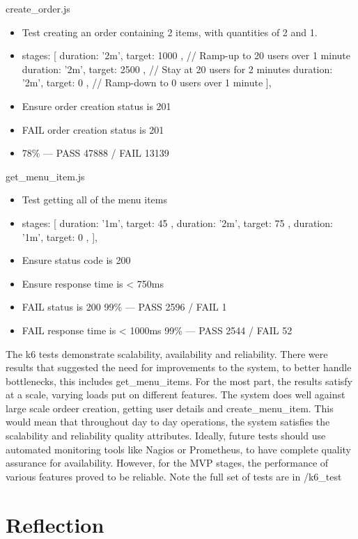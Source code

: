 \documentclass{article}
\begin{document}
\medskip \noindent create\_order.js
\begin{itemize}
    \item Test creating an order containing 2 items, with quantities of 2 and 1.
    \item 	stages: [
        { duration: '2m', target: 1000 }, // Ramp-up to 20 users over 1 minute
        { duration: '2m', target: 2500 }, // Stay at 20 users for 2 minutes
        { duration: '2m', target: 0 },  // Ramp-down to 0 users over 1 minute
    ],
    \item Ensure order creation status is 201
    \item FAIL order creation status is 201
    \item 78\% — PASS 47888 / FAIL 13139
\end{itemize}

\medskip \noindent  get\_menu\_item.js
\begin{itemize}
    \item Test getting all of the menu items
    \item 	stages: [
        { duration: '1m', target: 45 },
        { duration: '2m', target: 75 },
        { duration: '1m', target: 0 },
    ],
    \item Ensure status code is 200
    \item Ensure response time is < 750ms
    \item 	FAIL status is 200 99\% — PASS 2596 / FAIL 1
    \item FAIL response time is < 1000ms 99\% — PASS 2544 / FAIL 52
\end{itemize}

\medskip \noindent The k6 tests demonstrate scalability, availability and reliability. There were results that suggested the need for improvements to the system, to better handle bottlenecks, this includes get\_menu\_items. For the most part, the results satisfy at a scale, varying loads put on different features. The system does well against large scale ordeer creation, getting user details and create\_menu\_item. This would mean that throughout day to day operations, the system satisfies the scalability and reliability quality attributes. Ideally, future tests should use automated monitoring tools like Nagios or Prometheus, to have complete quality assurance for availability. However, for the MVP stages, the performance of various features proved to be reliable. Note the full set of tests are in /k6\_test


\section{Reflection}
\end{document}
